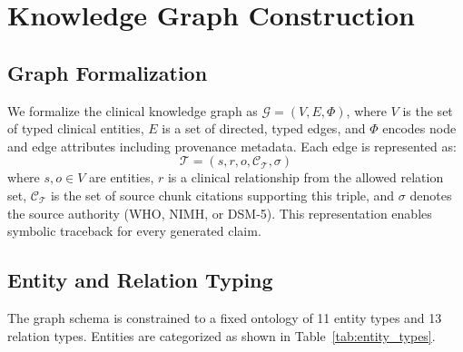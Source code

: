 \documentclass[12pt,a4paper]{article}
\begin{document}
\section{Knowledge Graph Construction}

\subsection{Graph Formalization}

We formalize the clinical knowledge graph as $\mathcal{G} = (V, E, \Phi)$, where $V$ is the set of typed clinical entities, $E$ is a set of directed, typed edges, and $\Phi$ encodes node and edge attributes including provenance metadata. Each edge is represented as:
\begin{equation}
    \mathcal{T} = (s, r, o, \mathcal{C}_{\mathcal{T}}, \sigma)
\end{equation}
where $s, o \in V$ are entities, $r$ is a clinical relationship from the allowed relation set, $\mathcal{C}_{\mathcal{T}}$ is the set of source chunk citations supporting this triple, and $\sigma$ denotes the source authority (WHO, NIMH, or DSM-5). This representation enables symbolic traceback for every generated claim.

\subsection{Entity and Relation Typing}

The graph schema is constrained to a fixed ontology of 11 entity types and 13 relation types. Entities are categorized as shown in Table~\ref{tab:entity_types}.
\end{document}
